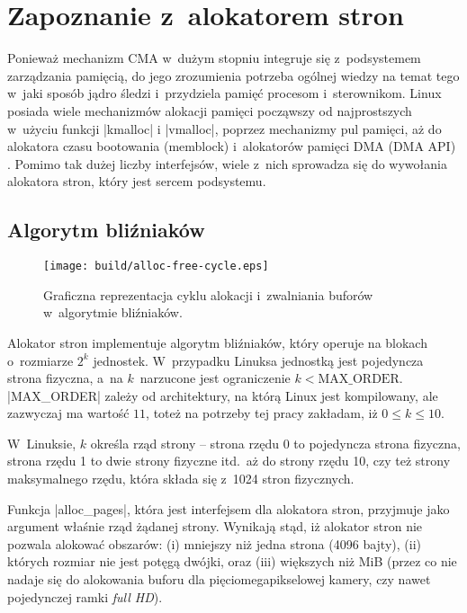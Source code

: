\section{Zapoznanie z~alokatorem stron}

Ponieważ mechanizm CMA w~dużym stopniu integruje się z~podsystemem
zarządzania pamięcią, do jego zrozumienia potrzeba ogólnej wiedzy na
temat tego w~jaki sposób jądro śledzi i~przydziela pamięć procesom
i~sterownikom.  Linux posiada wiele mechanizmów alokacji pamięci
począwszy od najprostszych w~użyciu funkcji \code|kmalloc|
i \code|vmalloc|, poprzez mechanizmy pul pamięci, aż do alokatora
czasu bootowania (memblock) i~alokatorów pamięci DMA (DMA API)
\autocite[rozdział 8]{bib:ldd3}.  Pomimo tak dużej liczby interfejsów,
wiele z~nich sprowadza się do wywołania alokatora stron, który jest
sercem podsystemu.

\subsection{Algorytm bliźniaków}

\begin{wrapfigure}{o}[1.5cm]{0.3\textwidth}
\begin{center}
\texttt{[image: build/alloc-free-cycle.eps]}
\end{center}
\caption[Zarządzanie pamięcią w~algorytmie bliźniaków]{Graficzna
  reprezentacja cyklu alokacji i~zwalniania buforów w~algorytmie
  bliźniaków.}
\end{wrapfigure}

Alokator stron implementuje algorytm bliźniaków, który operuje na
blokach o~rozmiarze $2^k$ jednostek.  W~przypadku Linuksa jednostką
jest pojedyncza strona fizyczna, a~na $k$~narzucone jest ograniczenie
$k < \mathrm{MAX\_ORDER}$.  \code|MAX_ORDER| zależy od architektury,
na którą Linux jest kompilowany, ale zazwyczaj ma wartość $11$, toteż
na potrzeby tej pracy zakładam, iż $0 \le k \le 10$.

W~Linuksie, $k$ określa rząd strony -- strona rzędu 0 to pojedyncza
strona fizyczna, strona rzędu 1 to dwie strony fizyczne itd.\ aż do
strony rzędu 10, czy też strony maksymalnego rzędu, która składa się
z~1024 stron fizycznych.

Funkcja \code|alloc_pages|, która jest interfejsem dla alokatora
stron, przyjmuje jako argument właśnie rząd żądanej strony.  Wynikają
stąd, iż alokator stron nie pozwala alokować obszarów: (i) mniejszy
niż jedna strona (4096 bajty), (ii) których rozmiar nie jest potęgą
dwójki, oraz (iii) większych niż \unit[4]{MiB} (przez co nie nadaje
się do alokowania buforu dla pięciomegapikselowej kamery, czy nawet
pojedynczej ramki \textit{full HD}).

